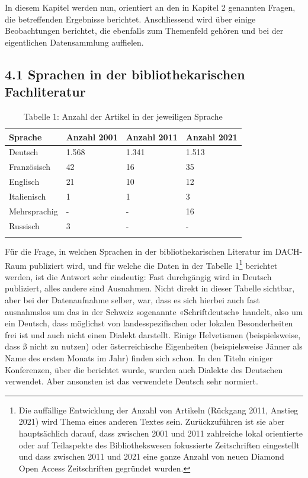\documentclass[a4paper,
fontsize=11pt,
oneside,
numbers=noperiodatend,
parskip=half-,
bibliography=totoc,
final
]{scrartcl}
\begin{document}
In diesem Kapitel werden nun, orientiert an den in Kapitel 2 genannten
Fragen, die betreffenden Ergebnisse berichtet. Anschliessend wird über
einige Beobachtungen berichtet, die ebenfalls zum Themenfeld gehören und
bei der eigentlichen Datensammlung auffielen.

\hypertarget{sprachen-in-der-bibliothekarischen-fachliteratur-1}{%
\subsection{4.1 Sprachen in der bibliothekarischen
Fachliteratur}\label{sprachen-in-der-bibliothekarischen-fachliteratur-1}}

\renewcommand*{\arraystretch}{1.4}
\begin{longtable}{llll}
\textbf{Sprache} & \textbf{Anzahl 2001} & \textbf{Anzahl 2011} & \textbf{Anzahl 2021} \\
\hline
Deutsch          & 1.568                & 1.341                & 1.513                \\
Französisch      & 42                   & 16                   & 35                   \\
Englisch         & 21                   & 10                   & 12                   \\
Italienisch      & 1                    & 1                    & 3                    \\
Mehrsprachig     & -                    & -                    & 16                   \\
Russisch         & 3                    & -                    & -                   \\
\caption{Tabelle 1: Anzahl der Artikel in der jeweiligen Sprache}\\
\end{longtable}

Für die Frage, in welchen Sprachen in der bibliothekarischen Literatur
im DACH-Raum publiziert wird, und für welche die Daten in der Tabelle
1\footnote{Die auffällige Entwicklung der Anzahl von Artikeln (Rückgang
  2011, Anstieg 2021) wird Thema eines anderen Textes sein.
  Zurückzuführen ist sie aber hauptsächlich darauf, dass zwischen 2001
  und 2011 zahlreiche lokal orientierte oder auf Teilaspekte des
  Bibliothekswesen fokussierte Zeitschriften eingestellt und dass
  zwischen 2011 und 2021 eine ganze Anzahl von neuen Diamond Open Access
  Zeitschriften gegründet wurden.} berichtet werden, ist die Antwort
sehr eindeutig: Fast durchgängig wird in Deutsch publiziert, alles
andere sind Ausnahmen. Nicht direkt in dieser Tabelle sichtbar, aber bei
der Datenaufnahme selber, war, dass es sich hierbei auch fast
ausnahmslos um das in der Schweiz sogenannte «Schriftdeutsch» handelt,
also um ein Deutsch, dass möglichst von landesspezifischen oder lokalen
Besonderheiten frei ist und auch nicht einen Dialekt darstellt. Einige
Helvetismen (beispielsweise, dass ß nicht zu nutzen) oder
österreichische Eigenheiten (beispielsweise Jänner als Name des ersten
Monats im Jahr) finden sich schon. In den Titeln einiger Konferenzen,
über die berichtet wurde, wurden auch Dialekte des Deutschen verwendet.
Aber ansonsten ist das verwendete Deutsch sehr normiert.
\end{document}
